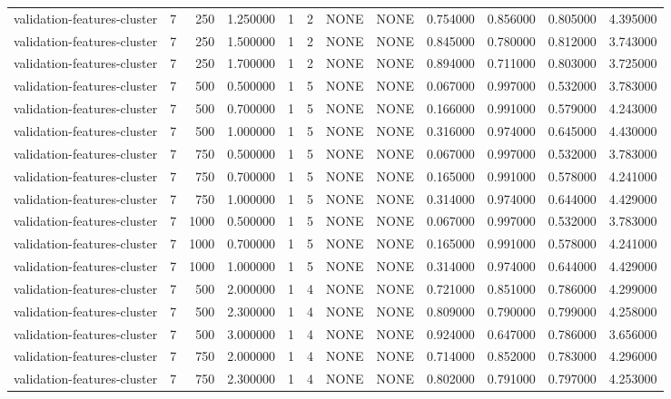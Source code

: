 \begin{tabular}{lrrrllllrrrr}
validation-features-cluster & 7 & 250 & 1.250000 & 1 & 2 & NONE & NONE & 0.754000 & 0.856000 & 0.805000 & 4.395000 \\
validation-features-cluster & 7 & 250 & 1.500000 & 1 & 2 & NONE & NONE & 0.845000 & 0.780000 & 0.812000 & 3.743000 \\
validation-features-cluster & 7 & 250 & 1.700000 & 1 & 2 & NONE & NONE & 0.894000 & 0.711000 & 0.803000 & 3.725000 \\
validation-features-cluster & 7 & 500 & 0.500000 & 1 & 5 & NONE & NONE & 0.067000 & 0.997000 & 0.532000 & 3.783000 \\
validation-features-cluster & 7 & 500 & 0.700000 & 1 & 5 & NONE & NONE & 0.166000 & 0.991000 & 0.579000 & 4.243000 \\
validation-features-cluster & 7 & 500 & 1.000000 & 1 & 5 & NONE & NONE & 0.316000 & 0.974000 & 0.645000 & 4.430000 \\
validation-features-cluster & 7 & 750 & 0.500000 & 1 & 5 & NONE & NONE & 0.067000 & 0.997000 & 0.532000 & 3.783000 \\
validation-features-cluster & 7 & 750 & 0.700000 & 1 & 5 & NONE & NONE & 0.165000 & 0.991000 & 0.578000 & 4.241000 \\
validation-features-cluster & 7 & 750 & 1.000000 & 1 & 5 & NONE & NONE & 0.314000 & 0.974000 & 0.644000 & 4.429000 \\
validation-features-cluster & 7 & 1000 & 0.500000 & 1 & 5 & NONE & NONE & 0.067000 & 0.997000 & 0.532000 & 3.783000 \\
validation-features-cluster & 7 & 1000 & 0.700000 & 1 & 5 & NONE & NONE & 0.165000 & 0.991000 & 0.578000 & 4.241000 \\
validation-features-cluster & 7 & 1000 & 1.000000 & 1 & 5 & NONE & NONE & 0.314000 & 0.974000 & 0.644000 & 4.429000 \\
validation-features-cluster & 7 & 500 & 2.000000 & 1 & 4 & NONE & NONE & 0.721000 & 0.851000 & 0.786000 & 4.299000 \\
validation-features-cluster & 7 & 500 & 2.300000 & 1 & 4 & NONE & NONE & 0.809000 & 0.790000 & 0.799000 & 4.258000 \\
validation-features-cluster & 7 & 500 & 3.000000 & 1 & 4 & NONE & NONE & 0.924000 & 0.647000 & 0.786000 & 3.656000 \\
validation-features-cluster & 7 & 750 & 2.000000 & 1 & 4 & NONE & NONE & 0.714000 & 0.852000 & 0.783000 & 4.296000 \\
validation-features-cluster & 7 & 750 & 2.300000 & 1 & 4 & NONE & NONE & 0.802000 & 0.791000 & 0.797000 & 4.253000 \\

\end{tabular}
